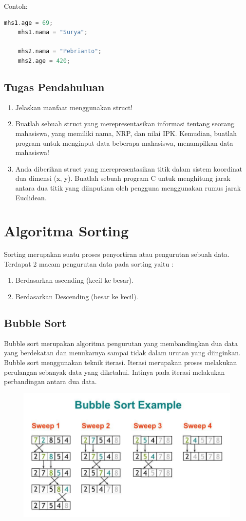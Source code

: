 Contoh:
\begin{lstlisting}[language=c]
    mhs1.age = 69;
    mhs1.nama = "Surya";
    
    mhs2.nama = "Pebrianto";
    mhs2.age = 420;
\end{lstlisting}

\subsection{Tugas Pendahuluan}
\begin{enumerate}
    \item Jelaskan manfaat menggunakan struct!
    \item Buatlah sebuah struct yang merepresentasikan informasi tentang seorang mahasiswa, yang memiliki nama, NRP, dan nilai IPK. Kemudian, buatlah program untuk menginput data beberapa mahasiswa, menampilkan data mahasiswa!
    \item Anda diberikan struct yang merepresentasikan titik dalam sistem koordinat dua dimensi (x, y). Buatlah sebuah program C untuk menghitung jarak antara dua titik yang diinputkan oleh pengguna menggunakan rumus jarak Euclidean.
\end{enumerate}

\section{Algoritma Sorting}
Sorting merupakan suatu proses penyortiran atau pengurutan sebuah data.\\
Terdapat 2 macam pengurutan data pada sorting yaitu :
\begin{enumerate}
    \item Berdasarkan ascending (kecil ke besar).
    \item Berdasarkan Descending (besar ke kecil).
\end{enumerate}

\subsection{Bubble Sort}
Bubble sort merupakan algoritma pengurutan yang membandingkan dua data yang berdekatan dan menukarnya sampai tidak dalam urutan yang diinginkan.
Bubble sort menggunakan teknik iterasi. Iterasi merupakan proses melakukan perulangan sebanyak data yang diketahui.
Intinya pada iterasi melakukan perbandingan antara dua data.

\begin{figure}[H]
    \centering
    \includegraphics[width=0.7\linewidth]{P4/img/screenshot006.png}
    \caption{}
    \label{fig:enam}
\end{figure}

